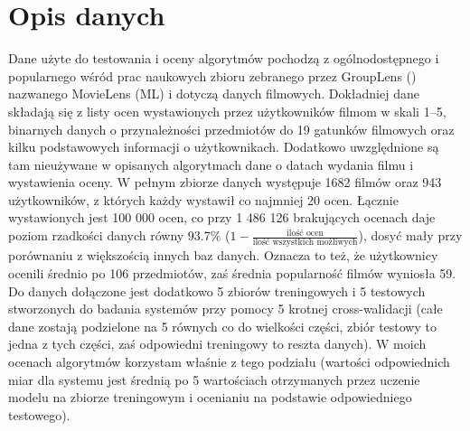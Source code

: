\documentclass{pracamgr}
\begin{document}
  \section{Opis danych}
   Dane użyte do testowania i oceny algorytmów pochodzą z ogólnodostępnego i popularnego wśród prac naukowych
   zbioru zebranego przez GroupLens (\cite{ML}) nazwanego MovieLens (ML) i dotyczą danych filmowych.\newline
   Dokładniej dane składają się z listy ocen wystawionych przez użytkowników filmom w skali 1--5,
   binarnych danych o przynależności przedmiotów do 19 gatunków filmowych oraz kilku podstawowych informacji o użytkownikach.
   Dodatkowo uwzględnione są tam nieużywane w opisanych algorytmach dane o datach wydania filmu i wystawienia oceny.
   W pełnym zbiorze danych występuje 1682 filmów oraz 943 użytkowników, z których każdy wystawił co najmniej 20 ocen.
   Łącznie wystawionych jest 100 000 ocen, co przy 1 486 126 brakujących ocenach daje poziom rzadkości danych równy 93.7\%
   ($1-\frac{\text{ilość ocen}}{\text{ilość wszystkich możliwych}}$), dosyć mały przy porównaniu z większością innych baz danych.
   Oznacza to też, że użytkownicy ocenili średnio po 106 przedmiotów, zaś średnia popularność filmów wyniosła 59.
   Do danych dołączone jest dodatkowo 5 zbiorów treningowych i 5 testowych stworzonych do badania systemów przy pomocy 5 krotnej cross-walidacji
   (całe dane zostają podzielone na 5 równych co do wielkości części, zbiór testowy to jedna z tych części, zaś odpowiedni treningowy to reszta danych).
   W moich ocenach algorytmów korzystam właśnie z tego podziału (wartości odpowiednich miar dla systemu jest średnią po 5 wartościach
   otrzymanych przez uczenie modelu na zbiorze treningowym i ocenianiu na podstawie odpowiedniego testowego).
\end{document}

